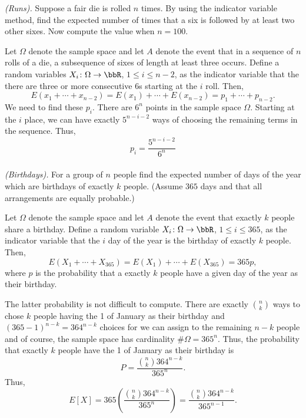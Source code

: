 \begin{problem}[Handout 6, \# 9]
  \emph{(Runs).} Suppose a fair die is rolled \(n\) times. By using the
  indicator variable method, find the expected number of times that a six
  is followed by at least two other sixes. Now compute the value when
  \(n=100\).
\end{problem}
\begin{solution}
  Let \(\Omega\) denote the sample space and let \(A\) denote the event
  that in a sequence of \(n\) rolls of a die, a subsequence of sixes of
  length at least three occurs. Define a random variables
  \(X_i\colon\Omega\to\bbR\), \(1\leq i\leq n-2\), as the indicator
  variable that the there are three or more consecutive \(6\)s starting at
  the \(i\) roll. Then,
  \[
    E(x_1+\dotsb+x_{n-2})=E(x_1)+\dotsb+E(x_{n-2})=p_1+\dotsb+p_{n-2}.
  \]
  We need to find these \(p_i\). There are \(6^n\) points in the sample
  space \(\Omega\). Starting at the \(i\) place, we can have
  exactly \(5^{n-i-2}\) ways of choosing the remaining terms in the
  sequence. Thus,
  \[
    p_i=\frac{5^{n-i-2}}{6^n}
  \]
  \begin{align*}
  \end{align*}
\end{solution}
\newpage

\begin{problem}[Handout 6, \# 10]
  \emph{(Birthdays).} For a group of \(n\) people find the expected number
  of days of the year which are birthdays of exactly \(k\) people. (Assume
  \(365\) days and that all arrangements are equally probable.)
\end{problem}
\begin{solution}
  Let \(\Omega\) denote the sample space and let \(A\) denote the event
  that exactly \(k\) people share a birthday. Define a random variable
  \(X_i\colon\Omega\to\bbR\), \(1\leq i\leq 365\), as the indicator
  variable that the \(i\) day of the year is the birthday of
  exactly \(k\) people. Then,
  \[
    E(X_1+\dotsb+X_{365})=E(X_1)+\dotsb+E(X_{365})=365p,
  \]
  where \(p\) is the probability that a exactly \(k\) people have a given
  day of the year as their birthday.

  The latter probability is not difficult to compute. There are exactly
  \(\binom{n}{k}\) ways to chose \(k\) people having the 1 of
  January as their birthday and \((365-1)^{n-k}=364^{n-k}\) choices for we
  can assign to the remaining \(n-k\) people and of course, the sample
  space has cardinality \(\#\Omega=365^n\). Thus, the probability that
  exactly \(k\) people have the 1 of January as their birthday
  is
  \[
    P=\frac{\binom{n}{k}364^{n-k}}{365^n}.
  \]
  Thus,
  \[
    E[X]
    =365\left(\frac{\binom{n}{k}364^{n-k}}{365^n}\right)
    =\frac{\binom{n}{k}364^{n-k}}{365^{n-1}}.
  \]
\end{solution}
\newpage


